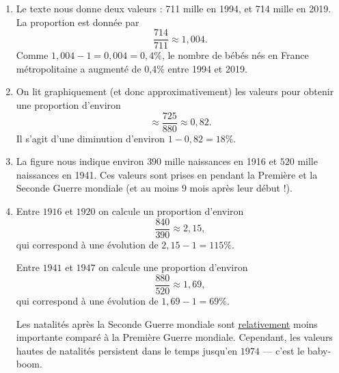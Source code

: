 \documentclass[a4paper, 14pt]{extarticle}
\theoremstyle{plain}
\theoremstyle{definition}
\newif\ifsolutions
\begin{document}
{\begin{enumerate}
		\item 
		Le texte nous donne deux valeurs : 711 mille en 1994, et 714 mille en 2019.
		La proportion est donnée par 
			\[ \dfrac{714}{711} \approx 1,004. \]
		Comme $1,004 - 1 = 0,004 = 0,4\%$, le nombre de bébés nés en France métropolitaine a augmenté de 0,4\% entre 1994 et 2019.
		
		\item
		On lit graphiquement (et donc approximativement) les valeurs pour obtenir une proportion d'environ
			\[ \approx \dfrac{725}{880} \approx 0,82. \]
		Il s'agit d'une diminution d'environ $1-0,82 = 18\%$.
		
		\item 
		La figure nous indique environ $390$ mille naissances en 1916 et $520$ mille naissances en 1941.
		Ces valeurs sont prises en pendant la Première et la Seconde Guerre mondiale (et au moins $9$ mois après leur début !).
		
		\item Entre $1916$ et $1920$ on calcule un proportion d'environ
			\[ \dfrac{840}{390} \approx 2,15, \]
		qui correspond à une évolution de $2,15-1 = 115\%$.
		
		Entre $1941$ et $1947$ on calcule une proportion d'environ
			\[ \dfrac{880}{520} \approx 1,69, \]
		qui correspond à une évolution de $1,69 - 1 = 69\%$.
		
		Les natalités après la Seconde Guerre mondiale sont \underline{relativement} moins importante comparé à la Première Guerre mondiale. 
		Cependant, les valeurs hautes de natalités persistent dans le temps jusqu'en $1974$ — c'est le baby-boom.
		
	\end{enumerate}
}

\ifsolutions
\else
\newpage
\fi
\end{document}
